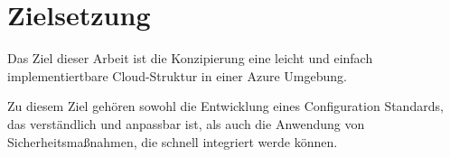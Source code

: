 \section{Zielsetzung}

Das Ziel dieser Arbeit ist die Konzipierung eine leicht und einfach implementiertbare Cloud-Struktur in einer Azure Umgebung.

Zu diesem Ziel gehören sowohl die Entwicklung eines Configuration Standards, das verständlich und anpassbar ist, als auch die Anwendung von Sicherheitsmaßnahmen, die schnell integriert werde können.